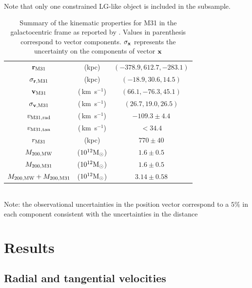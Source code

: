 \documentclass{emulateapj}
\newcommand{\kms}{\,km~s$^{-1}$}
\newcommand{\Msun}{{\ifmmode{{\rm {M_{\odot}}}}\else{${\rm{M_{\odot}}}$}\fi}}
\begin{document}
Note that only one constrained LG-like object is included in the subsample.


\begin{table}
\caption{Summary of the kinematic properties for M31 in the galactocentric frame as reported by \citep{vanderMarel12}. Values in parenthesis correspond to vector components. $\sigma_{\bf x}$ represents the uncertainty on the components of vector ${\bf x}$}
\begin{center}
\begin{tabular}{ccc}\hline\hline
${\bf r}_{\rm M31}$ & (kpc) &$(-378.9, 612.7, -283.1)$\\
$\sigma_{{\bf r}, {\rm M31}}$ & (kpc) &$(-18.9, 30.6, 14.5)$\\
${\bf v}_{\rm M31}$ & (\kms) & $(66.1, -76.3, 45.1)$\\
$\sigma_{{\bf v},{\rm M31}}$ & (\kms) &$(26.7, 19.0, 26.5)$\\
$v_{\rm M31,rad}$ &(\kms) & $-109.3\pm 4.4$\\
$v_{\rm M31,tan}$ &(\kms) & $<34.4$\\
$r_{\rm M31}$ &(kpc) & $770\pm 40$\\
$M_{\rm 200, MW}$ & ($10^{12}\Msun$) & $1.6\pm0.5$ \\
$M_{\rm 200, M31}$ & ($10^{12}\Msun$) & $1.6\pm0.5$ \\
$M_{\rm 200,MW} + M_{\rm 200, M31}$ & ($10^{12}\Msun$) & $3.14\pm 0.58$\\\hline

\end{tabular}\\
\vspace{1mm}
Note: the observational uncertainties in the position vector correspond to a $5\%$ in each component consistent with the uncertainties in the distance \citep[see references in][]{vanderMarel08}
\end{center}
\label{table:1}
\end{table}



\section{Results}
\label{sec:results}




\subsection{Radial and tangential velocities}
\end{document}

